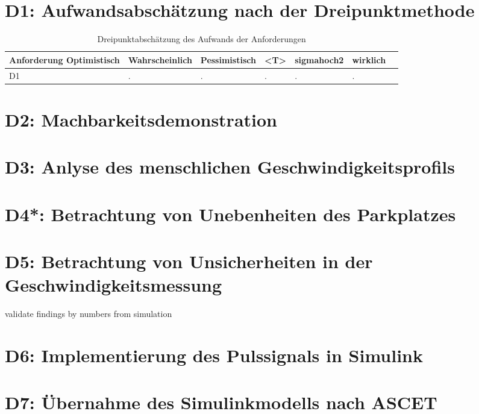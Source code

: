 
\chapter{D1: Aufwandsabschätzung nach der Dreipunktmethode}\label{cha:D1}
\begin{table}[H]
\centering
\caption{Dreipunktabschätzung des Aufwands der Anforderungen}
\begin{adjustbox}{width=1\textwidth, center=\textwidth}
\renewcommand{\arraystretch}{1}
\begin{tabular}{lllllll}
\textbf{Anforderung} \textbf{Optimistisch} & \textbf{Wahrscheinlich} & \textbf{Pessimistisch} & \textbf{<T>} & \textbf{sigmahoch2} & \textbf{wirklich}\\\hline
D1 & .& .& .& .& .&\\
\end{tabular}

\end{adjustbox}
\label{tbl:ConceptTPTPProductionSymbols}
\end{table}
\chapter{D2: Machbarkeitsdemonstration}\label{cha:D2}

\chapter{D3: Anlyse des menschlichen Geschwindigkeitsprofils}\label{cha:D3}

\chapter{D4*: Betrachtung von Unebenheiten des Parkplatzes}\label{cha:D4}

\chapter{D5: Betrachtung von Unsicherheiten in der Geschwindigkeitsmessung}\label{cha:D5}
validate findings by numbers from simulation

\chapter{D6: Implementierung des Pulssignals in Simulink}\label{cha:D6}

\chapter{D7: Übernahme des Simulinkmodells nach ASCET}\label{cha:D7}

